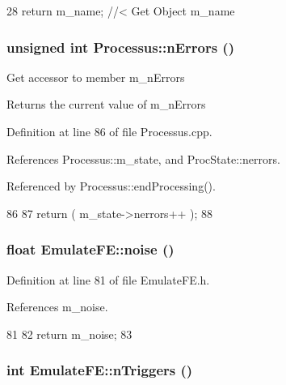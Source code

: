 \begin{DoxyCode}
28 { return m_name; } //< Get Object m_name
\end{DoxyCode}
\hypertarget{classProcessus_a82a0487f82f07cc2c2dc2731f98149e7}{
\subsubsection[{nErrors}]{\setlength{\rightskip}{0pt plus 5cm}unsigned int Processus::nErrors ()}}
\label{classProcessus_a82a0487f82f07cc2c2dc2731f98149e7}
Get accessor to member m\_\-nErrors \begin{DoxyReturn}{Returns}
the current value of m\_\-nErrors 
\end{DoxyReturn}


Definition at line 86 of file Processus.cpp.

References Processus::m\_\-state, and ProcState::nerrors.

Referenced by Processus::endProcessing().


\begin{DoxyCode}
86                                 {
87   return ( m_state->nerrors++ );
88 }
\end{DoxyCode}
\hypertarget{classEmulateFE_a3e1a2e88567bf16a5599a1602d6ba50d}{
\subsubsection[{noise}]{\setlength{\rightskip}{0pt plus 5cm}float EmulateFE::noise ()}}
\label{classEmulateFE_a3e1a2e88567bf16a5599a1602d6ba50d}


Definition at line 81 of file EmulateFE.h.

References m\_\-noise.


\begin{DoxyCode}
81                {
82     return m_noise;
83   }
\end{DoxyCode}
\hypertarget{classEmulateFE_ab08924ef9529a766ce80c9c1c9885cca}{
\subsubsection[{nTriggers}]{\setlength{\rightskip}{0pt plus 5cm}int EmulateFE::nTriggers ()}}
\label{classEmulateFE_ab08924ef9529a766ce80c9c1c9885cca}


